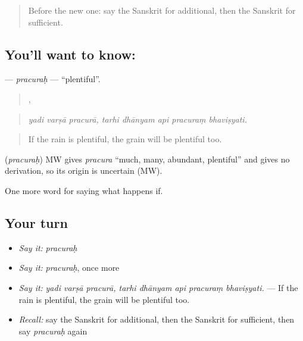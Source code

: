 \label{lesson:SA-C379-pracurah}



\begin{quote}
Before the new one: say the Sanskrit for additional, then the Sanskrit for sufficient.
\end{quote}

\subsection*{You'll want to know: }
\textbf{} — \emph{pracuraḥ} — \textquotedblleft{}plentiful\textquotedblright{}.

\begin{quote}
  ,     
\end{quote}

\begin{quote}
\emph{yadi varṣā pracurā, tarhi dhānyam api pracuraṃ bhaviṣyati.}
\end{quote}

\begin{quote}
If the rain is plentiful, the grain will be plentiful too.
\end{quote}

\begin{cousinweb}
\textbf{} (\emph{pracuraḥ}) MW gives \emph{pracura} \textquotedblleft{}much, many, abundant, plentiful\textquotedblright{} and gives no derivation, so its origin is uncertain (MW).
\end{cousinweb}

\begin{grammarlens}[title={What you've built}]
One more word for saying what happens if.
\end{grammarlens}

\subsection*{Your turn}
\begin{itemize}
\raggedright
  \item \emph{Say it:} \emph{pracuraḥ}
  \item \emph{Say it:} \emph{pracuraḥ}, once more
  \item \emph{Say it:} \emph{yadi varṣā pracurā, tarhi dhānyam api pracuraṃ bhaviṣyati.} — If the rain is plentiful, the grain will be plentiful too.
  \item \emph{Recall:} say the Sanskrit for additional, then the Sanskrit for sufficient, then say \emph{pracuraḥ} again
\end{itemize}

